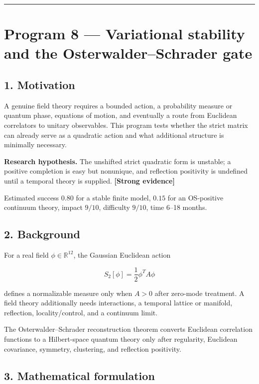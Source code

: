 \documentclass[11pt,a4paper,openany]{report}
\newcommand{\statusStrong}{\textcolor{finblue}{[Strong evidence]}}
\begin{document}
\par\medskip\hrule\medskip

\chapter{Program 8 — Variational stability and the Osterwalder–Schrader gate}

\section{1. Motivation}

A genuine field theory requires a bounded action, a probability measure or quantum phase, equations of motion, and eventually a route from Euclidean correlators to unitary observables. This program tests whether the strict matrix can already serve as a quadratic action and what additional structure is minimally necessary.

\textbf{Research hypothesis.} The unshifted strict quadratic form is unstable; a positive completion is easy but nonunique, and reflection positivity is undefined until a temporal theory is supplied. \textbf{\statusStrong{}}

Estimated success \(0.80\) for a stable finite model, \(0.15\) for an OS-positive continuum theory, impact \(9/10\), difficulty \(9/10\), time 6–18 months.

\section{2. Background}

For a real field \(\phi\in\mathbb R^{12}\), the Gaussian Euclidean action

\[
S_2[\phi]=\frac12\phi^TA\phi
\]

defines a normalizable measure only when \(A>0\) after zero-mode treatment. A field theory additionally needs interactions, a temporal lattice or manifold, reflection, locality/\allowbreak{}control, and a continuum limit.

The Osterwalder–Schrader reconstruction theorem converts Euclidean correlation functions to a Hilbert-space quantum theory only after regularity, Euclidean covariance, symmetry, clustering, and reflection positivity.

\section{3. Mathematical formulation}
\end{document}

